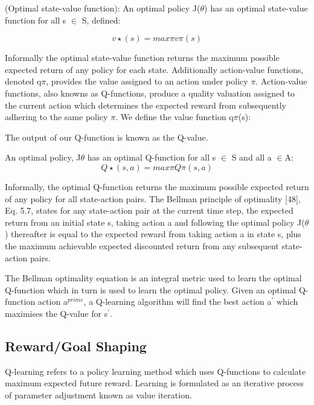 \documentclass[runningheads]{llncs}
\begin{document}

\begin{theorem}
	(Optimal state-value function): An optimal policy J($\theta$) has an optimal
	state-value function for all s $\in$ S, defined:
	
	\begin{equation}
		v\star(s) = max\pi v\pi(s)
	\end{equation}
\end{theorem}
Informally the optimal state-value function returns the maximum possible expected
return of any policy for each state. Additionally action-value functions, denoted q$\pi$,
provides the value assigned to an action under policy $\pi$. Action-value functions, also
knowns as Q-functions, produce a quality valuation assigned to the current action which
determines the expected reward from subsequently adhering to the same policy $\pi$. We
define the value function q$\pi$(s):
 
The output of our Q-function is known as the Q-value.

\begin{theorem}
An optimal policy, J$\theta$ has an optimal Q-function for
all s $\in$ S and all a $\in$A:
\begin{equation}
	Q\star(s,a) = max\pi Q\pi(s,a)
\end{equation} 
\end{theorem}

Informally, the optimal Q-function returns the maximum possible expected return
of any policy for all state-action pairs. The Bellman principle of optimality [48], Eq. 5.7,
states for any state-action pair at the current time step, the expected return from an initial
state s, taking action a and following the optimal policy J($\theta$) thereafter is equal to the
expected reward from taking action a in state s, plus the maximum achievable expected
discounted return from any subsequent state-action pairs.

The Bellman optimality equation is an integral metric used to learn the optimal Q-function
which in turn is used to learn the optimal policy. Given an optimal Q-function action a$^{prime}$, a
Q-learning algorithm will find the best action a$^{\prime}$ which maximises the Q-value for s$^{\prime}$.


\subsection{Reward/Goal Shaping}
Q-learning refers to a policy learning method which uses Q-functions to calculate maximum
expected future reward. Learning is formulated as an iterative process of parameter
adjustment known as value iteration.
\end{document}
